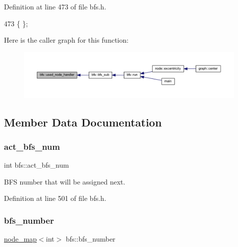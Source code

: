 Definition at line 473 of file bfs.\+h.


\begin{DoxyCode}
473 \{ \};
\end{DoxyCode}
Here is the caller graph for this function\+:
\nopagebreak
\begin{figure}[H]
\begin{center}
\leavevmode
\includegraphics[width=350pt]{classbfs_a5514649937b2e27f0bfc41ba868cb156_icgraph}
\end{center}
\end{figure}


\subsection{Member Data Documentation}
\mbox{\label{classbfs_a5a4adad9562896536b8b58ab237e8478}} 
\subsubsection{\texorpdfstring{act\+\_\+bfs\+\_\+num}{act\_bfs\_num}}
{\footnotesize\ttfamily int bfs\+::act\+\_\+bfs\+\_\+num\hspace{0.3cm}{\ttfamily [protected]}}



B\+FS number that will be assigned next. 



Definition at line 501 of file bfs.\+h.

\mbox{\label{classbfs_a59d0c5c5ad2715776b20b1aec03dbc3a}} 
\subsubsection{\texorpdfstring{bfs\+\_\+number}{bfs\_number}}
{\footnotesize\ttfamily \mbox{\hyperlink{classnode__map}{node\+\_\+map}}$<$int$>$ bfs\+::bfs\+\_\+number\hspace{0.3cm}{\ttfamily [protected]}}



